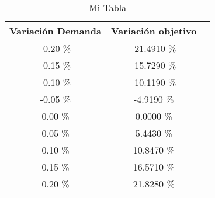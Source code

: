 \begin{table}
\centering
\begin{tabular}{|c|c|c|}
\hline
 Variación Demanda & Variación objetivo \\ \hline
-0.20 \% & -21.4910 \% \\ \hline
-0.15 \% & -15.7290 \% \\ \hline
-0.10 \% & -10.1190 \% \\ \hline
-0.05 \% & -4.9190 \% \\ \hline
0.00 \% & 0.0000 \% \\ \hline
0.05 \% & 5.4430 \% \\ \hline
0.10 \% & 10.8470 \% \\ \hline
0.15 \% & 16.5710 \% \\ \hline
0.20 \% & 21.8280 \% \\ \hline
\end{tabular}
\caption{Mi Tabla}
\end{table}
